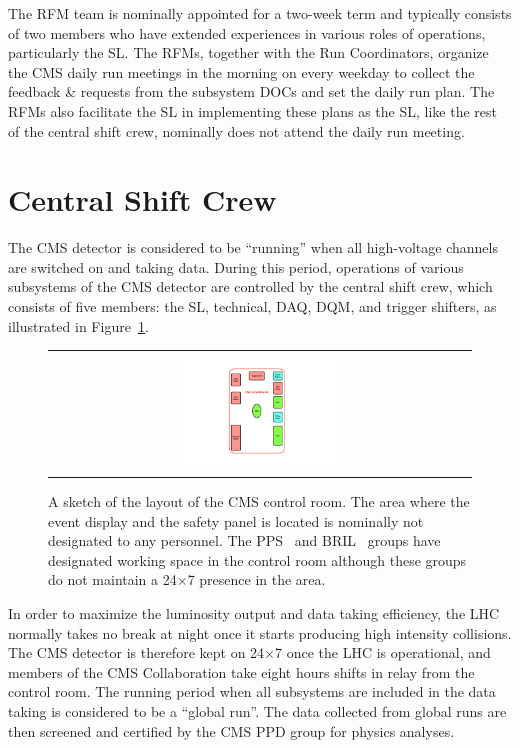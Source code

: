 The \ac{RFM} team is nominally appointed for a two-week term and typically consists of two members who have extended experiences in various roles of operations, particularly the \ac{SL}. The \acp{RFM}, together with the Run Coordinators, organize the \ac{CMS} daily run meetings in the morning on every weekday to collect the feedback \& requests from the subsystem \acp{DOC} and set the daily run plan. The \acp{RFM} also facilitate the \ac{SL} in implementing these plans as the \ac{SL}, like the rest of the central shift crew, nominally does not attend the daily run meeting.

\section{Central Shift Crew}
\label{sec:ControlRoom}

The \ac{CMS} detector is considered to be ``running'' when all high-voltage channels are switched on and taking data. During this period, operations of various subsystems of the \ac{CMS} detector are controlled by the central shift crew, which consists of five members: the \ac{SL}, technical, \ac{DAQ}, \ac{DQM}, and trigger shifters, as illustrated in Figure~\ref{fig:ControlRoom}. 

\begin{figure}[tbh!]
 \begin{center}
 \begin{tabular}{c}
 \includegraphics[width=0.4\textwidth]{figures/Part2/Operation/ControlRoom}
 \end{tabular}
 \caption{A sketch of the layout of the \ac{CMS} control room. The area where the event display and the safety panel is located is nominally not designated to any personnel. The \ac{PPS}~\cite{CMS:2014sdw} and \ac{BRIL}~\cite{CMS:2008xjf} groups have designated working space in the control room although these groups do not maintain a 24$\times$7 presence in the area.}
 \label{fig:ControlRoom}
 \end{center}
\end{figure}

In order to maximize the luminosity output and data taking efficiency, the \ac{LHC} normally takes no break at night once it starts producing high intensity collisions. The \ac{CMS} detector is therefore kept on 24$\times$7 once the \ac{LHC} is operational, and members of the \ac{CMS} Collaboration take eight hours shifts in relay from the control room. The running period when all subsystems are included in the data taking is considered to be a ``global run''. The data collected from global runs are then screened and certified by the \ac{CMS} \ac{PPD} group for physics analyses. 

